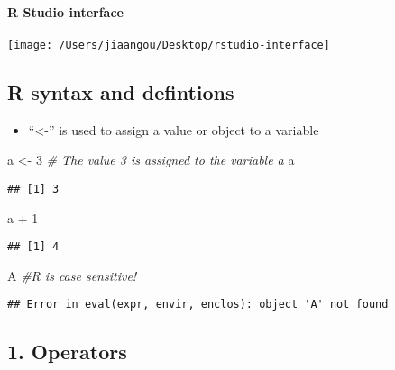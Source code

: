 \documentclass[]{article}
\newenvironment{Shaded}{\begin{snugshade}}{\end{snugshade}}
\newcommand{\DecValTok}[1]{\textcolor[rgb]{0.00,0.00,0.81}{{#1}}}
\newcommand{\StringTok}[1]{\textcolor[rgb]{0.31,0.60,0.02}{{#1}}}
\newcommand{\CommentTok}[1]{\textcolor[rgb]{0.56,0.35,0.01}{\textit{{#1}}}}
\newcommand{\NormalTok}[1]{{#1}}
\providecommand{\tightlist}{%
  \setlength{\itemsep}{0pt}\setlength{\parskip}{0pt}}
\let\oldparagraph\paragraph
\renewcommand{\paragraph}[1]{\oldparagraph{#1}\mbox{}}
\begin{document}
\paragraph{R Studio interface}\label{r-studio-interface}

\begin{center}\texttt{[image: /Users/jiaangou/Desktop/rstudio-interface]} \end{center}

\subsection{R syntax and defintions}\label{r-syntax-and-defintions}

\begin{itemize}
\tightlist
\item
  ``\textless{}-'' is used to assign a value or object to a variable
\end{itemize}

\begin{Shaded}
\begin{Highlighting}[]
\NormalTok{a <-}\StringTok{ }\DecValTok{3} \CommentTok{# The value 3 is assigned to the variable a}
\NormalTok{a}
\end{Highlighting}
\end{Shaded}

\begin{verbatim}
## [1] 3
\end{verbatim}

\begin{Shaded}
\begin{Highlighting}[]
\NormalTok{a +}\StringTok{ }\DecValTok{1}
\end{Highlighting}
\end{Shaded}

\begin{verbatim}
## [1] 4
\end{verbatim}

\begin{Shaded}
\begin{Highlighting}[]
\NormalTok{A }\CommentTok{#R is case sensitive! }
\end{Highlighting}
\end{Shaded}

\begin{verbatim}
## Error in eval(expr, envir, enclos): object 'A' not found
\end{verbatim}

\subsection{1. Operators}\label{operators}
\end{document}
